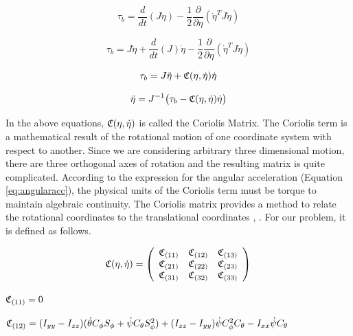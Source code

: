 \begin{equation}
    \tau_b =\frac{d}{dt} ( J \dot{\eta} ) - \frac{1}{2} \frac{\partial}{\partial \eta} ( \dot{\eta}^T J \dot{\eta}  )
\end{equation}

\begin{equation}
    \tau_b =J \ddot{\eta} + \frac{d}{dt}(J) \dot{\eta} - \frac{1}{2} \frac{\partial}{\partial \eta} ( \dot{\eta}^T J \dot{\eta}  )
\end{equation}

\begin{equation}
    \tau_b =  J \ddot{\eta} + \mathfrak{C}(\eta,\dot{\eta}) \dot{\eta}
\end{equation}

\begin{equation}
    \label{eq:angularacc}
    \ddot{\eta} = J^{-1} \big( \tau_b - \cc(\eta,\dot{\eta}) \dot{\eta} \big)
\end{equation}

In the above equations, $\mathfrak{C}(\eta,\dot{\eta})$ is called the Coriolis Matrix. The Coriolis term is a mathematical result of the rotational motion of one coordinate system with respect to another. Since we are considering arbitrary three dimensional motion, there are three orthogonal axes of rotation and the resulting matrix is quite complicated. According to the expression for the angular acceleration (Equation \eqref{eq:angularacc}), the physical units of the Coriolis term must be torque to maintain algebraic continuity. The Coriolis matrix provides a method to relate the rotational coordinates to the translational coordinates \cite{Coriolis}, \cite{Hestenes}. For our problem, it is defined as follows.

\begin{equation}
\label{cor}
    \cc(\eta,\dot{\eta}) =
    \left(
        \begin{array}{c c c}
            \cc_{(11)} & \cc_{(12)} & \cc_{(13)} \\
            \cc_{(21)} & \cc_{(22)} & \cc_{(23)} \\
            \cc_{(31)} & \cc_{(32)} & \cc_{(33)} \\
        \end{array}
    \right)
\end{equation}




$\mathfrak{C}_{(11)} = 0$

$\mathfrak{C}_{(12)}  = (I_{yy}-I_{zz})  ( \dot{\theta} C_{\phi} S_{\phi} +  \dot{\psi} C_{\theta} S_{\phi}^2 )  + (I_{zz}-I_{yy})  \dot{\psi} C_{\phi}^2 C_{\theta} - I_{xx}  \dot{\psi} C_{\theta}$


